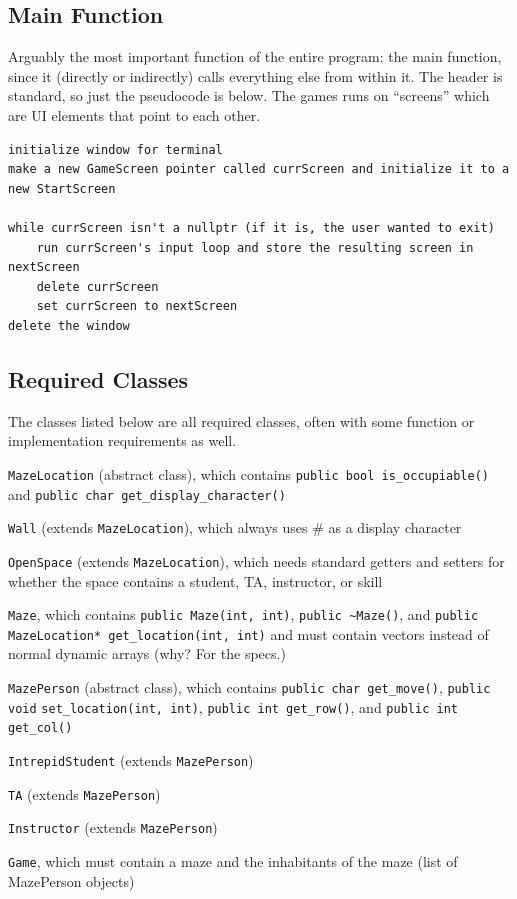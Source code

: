 \documentclass[11pt]{article} %
\begin{document}
\subsection{Main Function}
Arguably the most important function of the entire program: the main function, since it (directly or indirectly) calls everything else from within it. The header is standard, so just the pseudocode is below. The games runs on ``screens'' which are UI elements that point to each other. 

\begin{lstlisting}
initialize window for terminal
make a new GameScreen pointer called currScreen and initialize it to a new StartScreen

while currScreen isn't a nullptr (if it is, the user wanted to exit)
	run currScreen's input loop and store the resulting screen in nextScreen
	delete currScreen
	set currScreen to nextScreen
delete the window
\end{lstlisting}

\subsection{Required Classes}
The classes listed below are all required classes, often with some function or implementation requirements as well. 
\begin{compactitem}
	\item \verb|MazeLocation| (abstract class), which contains \verb|public bool is_occupiable()| and \verb|public char get_display_character()|
	\item \verb|Wall| (extends \verb|MazeLocation|), which always uses \# as a display character
	\item \verb|OpenSpace| (extends \verb|MazeLocation|), which needs standard getters and setters for whether the space contains a student, TA, instructor, or skill
	\item \verb|Maze|, which contains \verb|public Maze(int, int)|, \verb|public ~Maze()|, and \verb|public| \\ \verb|MazeLocation* get_location(int, int)| and must contain vectors instead of normal dynamic arrays (why? For the specs.)
	\item \verb|MazePerson| (abstract class), which contains \verb|public char get_move()|, \verb|public void| \verb|set_location(int, int)|, \verb|public int get_row()|, and \verb|public int get_col()|
	\item \verb|IntrepidStudent| (extends \verb|MazePerson|)
	\item \verb|TA| (extends \verb|MazePerson|)
	\item \verb|Instructor| (extends \verb|MazePerson|)
	\item \verb|Game|, which must contain a maze and the inhabitants of the maze (list of MazePerson objects)
\end{compactitem}
\end{document}
